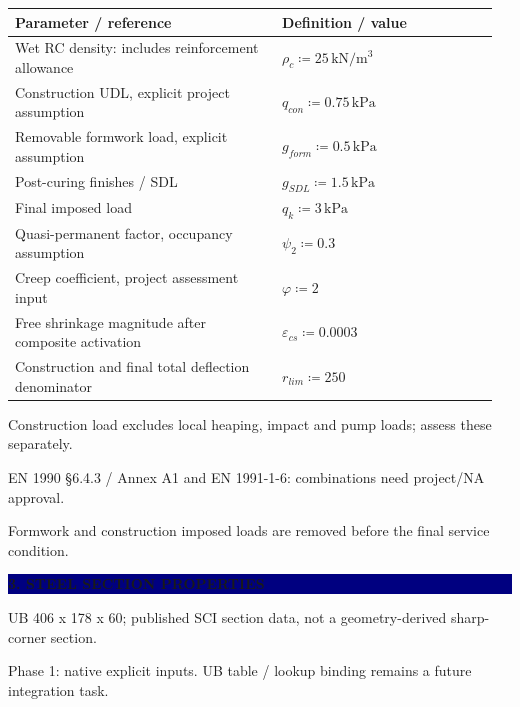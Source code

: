\documentclass[a4paper,10pt]{article}
\newcommand{\sect}[1]{\Needspace{30mm}\vspace{10pt}\noindent\colorbox{navy}{\parbox{\dimexpr\linewidth-2\fboxsep}{\vspace{4pt}\color{white}\large\bfseries #1\vspace{4pt}}}\par\vspace{3pt}}
\begin{document}
\Needspace{22mm}\par
\Needspace{25mm}\begin{longtable}{@{}p{0.53\linewidth}p{0.43\linewidth}@{}}\rowcolor{light}\textbf{Parameter / reference} & \textbf{Definition / value}\\\midrule
{\small Wet RC density: includes reinforcement allowance} & {\small $\rho_c\coloneq 25\,\mathrm{kN/m^3}$}\\[5pt]
{\small Construction UDL, explicit project assumption} & {\small $q_{con}\coloneq 0.75\,\mathrm{kPa}$}\\[5pt]
{\small Removable formwork load, explicit assumption} & {\small $g_{form}\coloneq 0.5\,\mathrm{kPa}$}\\[5pt]
{\small Post-curing finishes / SDL} & {\small $g_{SDL}\coloneq 1.5\,\mathrm{kPa}$}\\[5pt]
{\small Final imposed load} & {\small $q_k\coloneq 3\,\mathrm{kPa}$}\\[5pt]
{\small Quasi-permanent factor, occupancy assumption} & {\small $\psi_2\coloneq 0.3$}\\[5pt]
{\small Creep coefficient, project assessment input} & {\small $\varphi\coloneq 2$}\\[5pt]
{\small Free shrinkage magnitude after composite activation} & {\small $\varepsilon_{cs}\coloneq 0.0003$}\\[5pt]
{\small Construction and final total deflection denominator} & {\small $r_{lim}\coloneq 250$}\\[5pt]\bottomrule\end{longtable}
{\small\color{muted}Construction load excludes local heaping, impact and pump loads; assess these separately.}\par
{\small\color{muted}EN 1990 §6.4.3 / Annex A1 and EN 1991-1-6: combinations need project/NA approval.}\par
{\small\color{muted}Formwork and construction imposed loads are removed before the final service condition.}\par
\sect{3. STEEL SECTION PROPERTIES}
{\small\color{muted}UB 406 x 178 x 60; published SCI section data, not a geometry-derived sharp-corner section.}\par
{\small\color{muted}Phase 1: native explicit inputs. UB table / lookup binding remains a future integration task.}\par
\end{document}
